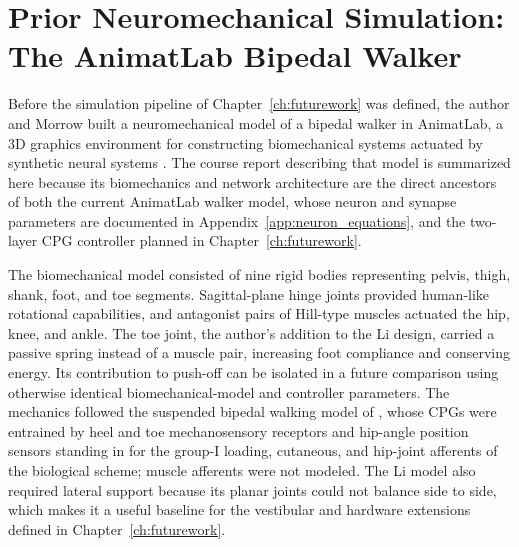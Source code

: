 \section{Prior Neuromechanical Simulation: The AnimatLab Bipedal Walker}\label{sec:prior_walker}

Before the simulation pipeline of Chapter~\ref{ch:futurework} was defined, the author and Morrow built a neuromechanical model of a bipedal walker in AnimatLab, a 3D graphics environment for constructing biomechanical systems actuated by synthetic neural systems \citep{cofer_animatlab_2010}. The course report describing that model \citep{bolen_design_2020} is summarized here because its biomechanics and network architecture are the direct ancestors of both the current AnimatLab walker model, whose neuron and synapse parameters are documented in Appendix~\ref{app:neuron_equations}, and the two-layer CPG controller planned in Chapter~\ref{ch:futurework}.

The biomechanical model consisted of nine rigid bodies representing pelvis, thigh, shank, foot, and toe segments. Sagittal-plane hinge joints provided human-like rotational capabilities, and antagonist pairs of Hill-type muscles actuated the hip, knee, and ankle. The toe joint, the author's addition to the Li design, carried a passive spring instead of a muscle pair, increasing foot compliance and conserving energy. Its contribution to push-off can be isolated in a future comparison using otherwise identical biomechanical-model and controller parameters. The mechanics followed the suspended bipedal walking model of \citet{li_bipedal_2017}, whose CPGs were entrained by heel and toe mechanosensory receptors and hip-angle position sensors standing in for the group-I loading, cutaneous, and hip-joint afferents of the biological scheme; muscle afferents were not modeled. The Li model also required lateral support because its planar joints could not balance side to side, which makes it a useful baseline for the vestibular and hardware extensions defined in Chapter~\ref{ch:futurework}.

